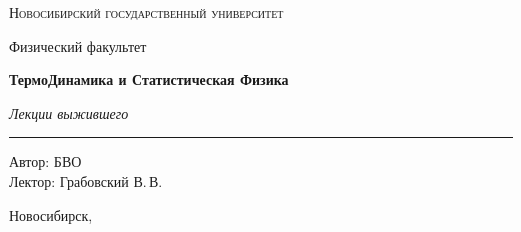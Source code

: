 \documentclass[12pt,a4paper]{report}
\begin{document}
\hypersetup{pageanchor=false}
\begin{titlepage}
    \thispagestyle{empty}

    \begin{center}
        \vspace*{1.5cm}

        {\Large\scshape Новосибирский государственный университет\par}
        \vspace{0.25cm}
        {\large Физический факультет\par}

        \vfill

        {\Huge\bfseries ТермоДинамика и Статистическая Физика\par}

        \vspace{0.45cm}

        {\Large\itshape Лекции выжившего\par}

        \vspace{0.8cm}

        \rule{0.72\linewidth}{0 pt}





        \vfill

        \begin{flushright}
            \large
            Автор: БВО\\[0.25cm]
            Лектор: Грабовский В.\,В.
        \end{flushright}

        \vspace{1.2cm}

        {\large Новосибирск, \the\year}

    \end{center}
\end{titlepage}
\hypersetup{pageanchor=true}

\tableofcontents
\newpage



\clearpage

\clearpage

\clearpage

\clearpage

\clearpage

\clearpage

\clearpage

\clearpage

\clearpage

\clearpage
\end{document}
